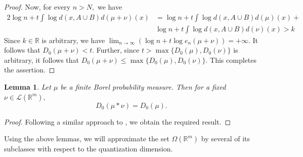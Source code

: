 \documentclass{amsproc}
\newtheorem{lemma}[theorem]{Lemma}
\theoremstyle{definition}
\theoremstyle{remark}
\numberwithin{equation}{section}
\begin{document}
\begin{proof}
  Now, for every $n > N,$ we have 
  \begin{equation*}
      \begin{aligned}
          2 \log n + t \int \log d(x, A \cup B) d(\mu + \nu)(x) & =  \log n + t \int \log d(x, A \cup B) d(\mu)(x) + \\& \log n + t \int \log d(x, A \cup B) d(\nu)(x) > k
      \end{aligned}
  \end{equation*}
     Since $k \in \mathbb{R}$ is arbitrary, we have $\lim_{n \to \infty}(\log n+ t \log e_{n}(\mu + \nu )) = +\infty$. It follows that $D_{0}(\mu + \nu) < t.$ Further, since $t > \max\{D_{0}(\mu), D_{0}(\nu)\}$ is arbitrary, it follows that $D_{0}(\mu + \nu) \le \max\{D_{0}(\mu), D_{0}(\nu)\}.$ This completes the assertion.
 \end{proof}
\begin{lemma}\label{lem09}
 Let $\mu$ be a finite Borel probability measure. Then for a fixed $\nu \in \mathcal{L}(\mathbb{R}^m),$ 
 $$D_{0}(\mu * \nu) = D_{0}(\mu).$$
\end{lemma}
\begin{proof}
    Following a similar approach to \cite[Lemma 3.10]{VAD}, we obtain the required result.
\end{proof}
Using the above lemmas, we will approximate the set $\Omega(\mathbb{R}^m)$ by several of its subclasses with respect to the quantization dimension.

\end{document}
